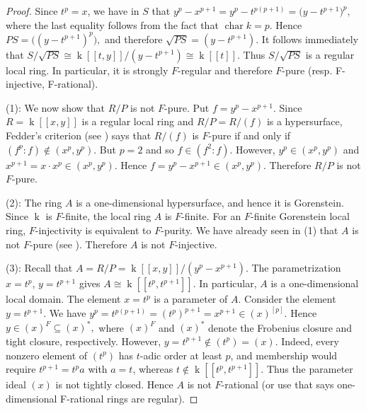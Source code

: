\documentclass[10pt,a4paper]{amsart}
\theoremstyle{definition}
\theoremstyle{remark}
\newcommand{\kk}{\operatorname{k}}
\begin{document}
		\begin{proof}
		Since $t^p=x$, we have in $S$ that
	 $
		y^p-x^{p+1}
		=
		y^p-t^{p(p+1)}
		=
		\bigl(y-t^{p+1}\bigr)^p,
		$ where the last equality follows from the fact that
		$\operatorname{char}k=p$.  Hence
$
		PS=\bigl((y-t^{p+1})^p\bigr),
		$ and therefore
 $
		\sqrt{PS}=(y-t^{p+1}).
 $
It follows immediately that
$
		S/\sqrt{PS}
		\cong
		\kk[[t,y]]/(y-t^{p+1})
		\cong
		\kk[[t]].
		$ Thus $S/\sqrt{PS}$ is a regular local ring.  In particular, it is
		strongly $F$-regular and therefore $F$-pure (resp. F-injective, F-rational).
	
	(1):	We now show that $R/P$ is not $F$-pure.  Put
	$
		f=y^p-x^{p+1}.
		$ Since $R=\kk[[x,y]]$ is a regular local ring and $R/P=R/(f)$ is a
		hypersurface, Fedder's criterion (see \cite[Theorem 2.5]{MP}) says that $R/(f)$ is $F$-pure if and
		only if
 $
		(f^p:f)\notin (x^p,y^p).
		$ But $p=2$ and so $f\in(f^2:f)$.
		However,
 $
		y^p\in (x^p,y^p)
		$ and
	 $
		x^{p+1}=x\cdot x^p\in (x^p,y^p).
		$ 	Hence
	 $
		f=y^p-x^{p+1}\in (x^p,y^p).
		$ Therefore
$
		R/P
		$ 	is not $F$-pure.
		
	(2): The ring $A$ is a one-dimensional hypersurface, and hence it is
		Gorenstein.
	Since $\kk$ is $F$-finite, the local ring $A$ is
		$F$-finite.  For an $F$-finite Gorenstein local ring, $F$-injectivity
		is equivalent to $F$-purity.
	 We have already seen in (1) that $A$ is not $F$-pure (see \cite[Ex. 21]{MP}).   Therefore $A$ is not $F$-injective.

	(3):
Recall that
 $
		A=R/P
		=
		\kk[[x,y]]/(y^p-x^{p+1}).
		$ 	The parametrization
	 $
		x=t^p$,  $y=t^{p+1}
		$ 	gives
	 $
		A\cong \kk[[t^p,t^{p+1}]].
		$ 	In particular, $A$ is a one-dimensional local domain.
	 	The element
	 $
		x=t^p
		$ 	is a parameter of $A$.  Consider the element
 $
		y=t^{p+1}.
		$ 	We have
 $
		y^p=t^{p(p+1)}
		=(t^p)^{p+1}
		=x^{p+1}\in (x)^{[p]}.
		$ 
	 Hence
 $
		y\in (x)^F\subseteq (x)^*,
 $
 where $(x)^F$ and $(x)^*$ denote the Frobenius closure and tight
		closure, respectively.
 However,
 $
		y=t^{p+1}\notin (t^p)=(x).
		$ 	Indeed, every nonzero element of $(t^p)$ has $t$-adic order at least
		$p$, and membership would require
	 $
		t^{p+1}=t^p a
		$ 
		with $a=t$, whereas $t\notin \kk[[t^p,t^{p+1}]]$.
		Thus the parameter ideal $(x)$ is not tightly closed.  Hence $A$ is
		not $F$-rational (or use \cite[Proposition 4.4]{MP} that says one-dimensional F-rational rings are regular).
	\end{proof}
\end{document}

